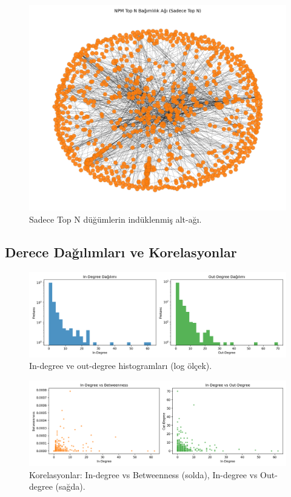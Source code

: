 \documentclass[11pt,a4paper]{article}
\begin{document}
\begin{figure}[h]
  \centering
  \includegraphics{network_topN_only.png}
  \caption{Sadece Top N düğümlerin indüklenmiş alt-ağı.}
\end{figure}

\subsection{Derece Dağılımları ve Korelasyonlar}
\begin{figure}[h]
  \centering
  \includegraphics{degree_histograms.png}
  \caption{In-degree ve out-degree histogramları (log ölçek).}
\end{figure}

\begin{figure}[h]
  \centering
  \includegraphics{scatter_correlations.png}
  \caption{Korelasyonlar: In-degree vs Betweenness (solda), In-degree vs Out-degree (sağda).}
\end{figure}
\end{document}
